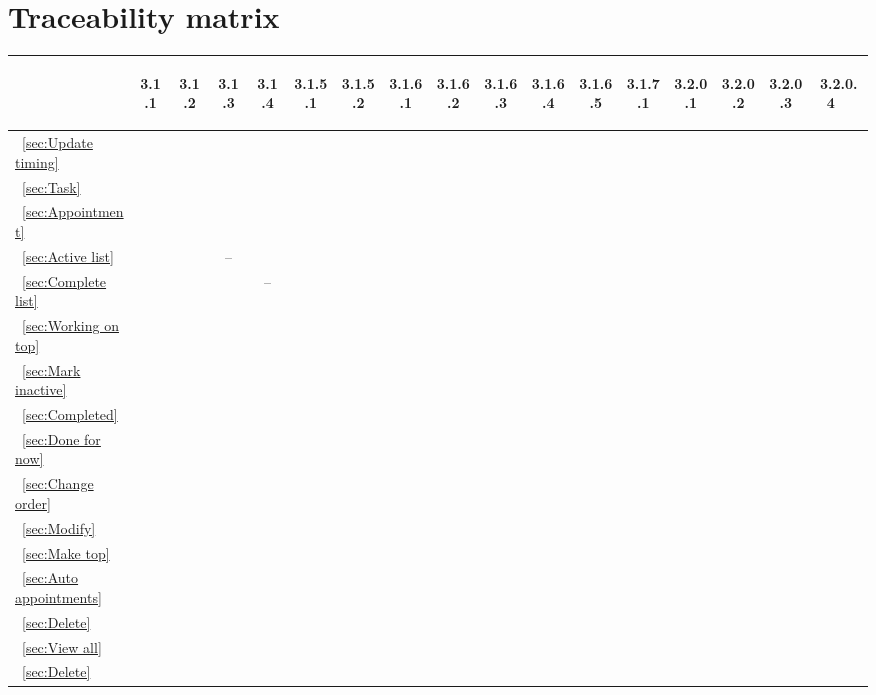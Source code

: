 \documentclass[12pt]{article}
\renewcommand{\c}{\checkmark}
\newcommand{\s}[1] {\begin{sideways}#1\end{sideways}}
\begin{document}
\section{Traceability matrix}
\begin{center}
\begin{tabular}{|l||*{16}{c|}}
\hline
	& \s{3.1.1} & \s{3.1.2} & \s{3.1.3} & \s{3.1.4} & \s{3.1.5.1} & \s{3.1.5.2} & \s{3.1.6.1} & \s{3.1.6.2} & \s{3.1.6.3} & \s{3.1.6.4} & \s{3.1.6.5} & \s{3.1.7.1} & \s{3.2.0.1} & \s{3.2.0.2} & \s{3.2.0.3} & \s{3.2.0.4~~}\\
\hline
\hline
~\ref{sec:Update timing}	&	&	&	&	&	&	&	&	&	&	&	&	&\c	&	&	&	\\
\hline
~\ref{sec:Task}				&\c	&	&	&	&	&	&	&	&	&	&	&	&	&	&	&	\\
\hline
~\ref{sec:Appointment}		&	&\c	&	&	&	&	&	&	&	&	&	&	&	&	&	&	\\
\hline
~\ref{sec:Active list}		&	&	&--	&	&	&	&	&	&	&	&	&	&	&	&	&	\\
\hline
~\ref{sec:Complete list}	&	&	&	&--	&	&	&	&	&	&	&	&	&	&	&	&	\\
\hline
~\ref{sec:Working on top}	&	&	&	&	&	&	&\c	&	&	&	&	&	&	&	&	&	\\
\hline
~\ref{sec:Mark inactive}	&	&	&	&	&	&	&	&\c	&	&	&	&	&	&	&	&	\\
\hline
~\ref{sec:Completed}		&	&	&	&	&	&	&	&	&\c	&	&	&	&	&	&	&	\\
\hline
~\ref{sec:Done for now}		&	&	&	&	&	&	&	&	&	&\c	&	&	&	&	&	&	\\
\hline
~\ref{sec:Change order}		&	&	&	&	&	&\c	&	&	&	&	&\c	&	&	&	&	&	\\
\hline
~\ref{sec:Modify}			&	&	&	&	&\c	&	&	&	&	&	&	&	&	&	&	&	\\
\hline
~\ref{sec:Make top}			&	&	&	&	&	&\c	&	&	&	&	&	&	&	&	&	&	\\
\hline
~\ref{sec:Auto appointments}&	&	&	&	&	&	&	&	&	&	&	&\c	&\c	&	&	&	\\
\hline
~\ref{sec:Delete}			&	&	&	&	&	&	&	&	&	&	&	&	&	&	&	&\c	\\
\hline
~\ref{sec:View all}			&	&	&	&	&	&	&	&	&	&	&	&	&	&	&\c	&	\\
\hline
~\ref{sec:Delete}			&	&	&	&	&	&	&	&	&	&	&	&	&	&	&	&	\\
\hline
\end{tabular}
\end{center}
\end{document}
